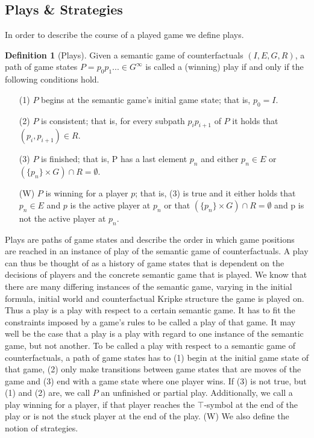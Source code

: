\documentclass[a4paper,american,10pt]{paper}
\theoremstyle{definition}\newtheorem{definition}{Definition}
\begin{document}
\subsection{Plays \& Strategies}
In order to describe the course of a played game we define plays.
\begin{definition}[Plays]
Given a semantic game of counterfactuals $(I, E, G, R)$, a path of game states $P=p_0p_1...\in G^{\infty}$ is called a (winning) play if and only if the following conditions hold.
\begin{itemize}
	\item[(1)] $P$ begins at the semantic game's initial game state; that is, $p_0=I$.
	\item[(2)] $P$ is consistent; that is, for every subpath $p_ip_{i+1}$ of $P$ it holds that $(p_{i},p_{i+1})\in R$.
	\item[(3)] $P$ is finished; that is, P has a last element $p_n$ and either $p_n\in E$ or $(\{p_n\}\times G)\cap R = \emptyset$.
	\item[(W)] $P$ is winning for a player $p$; that is, (3) is true and it either holds that $p_n\in E$ and $p$ is the active player at $p_n$ or that $(\{p_n\}\times G)\cap R = \emptyset$ and p is not the active player at $p_n$.
\end{itemize}
\end{definition}
Plays are paths of game states and describe the order in which game positions are reached in an instance of play of the semantic game of counterfactuals. A play can thus be thought of as a history of game states that is dependent on the decisions of players and the concrete semantic game that is played. We know that there are many differing instances of the semantic game, varying in the initial formula, initial world and counterfactual Kripke structure the game is played on. Thus a play is a play with respect to a certain semantic game. It has to fit the constraints imposed by a game's rules to be called a play of that game. It may well be the case that a play is a play with regard to one instance of the semantic game, but not another. To be called a play with respect to a semantic game of counterfactuals, a path of game states has to (1) begin at the initial game state of that game, (2) only make transitions between game states that are moves of the game and (3) end with a game state where one player wins. If (3) is not true, but (1) and (2) are, we call $P$ an unfinished or partial play. Additionally, we call a play winning for a player, if that player reaches the $\top$-symbol at the end of the play or is not the stuck player at the end of the play. (W) We also define the notion of strategies.
\end{document}

